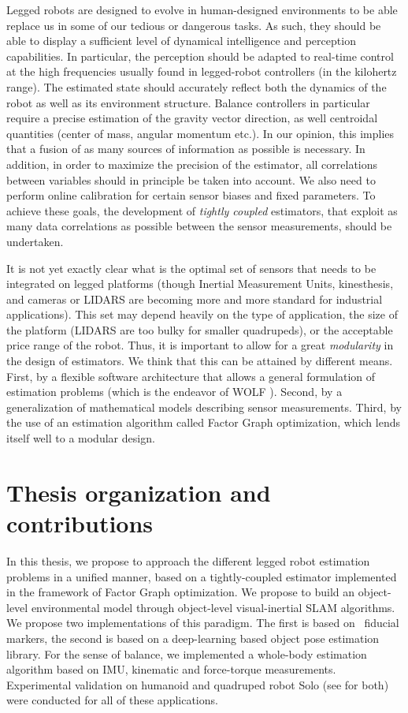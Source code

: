 Legged robots are designed to evolve in human-designed environments to be able replace us in some of our tedious or dangerous tasks. As such, they should be able to
display a sufficient level of dynamical intelligence and perception capabilities. 
In particular, the perception should be adapted to real-time control at the high frequencies usually found in legged-robot controllers (in the kilohertz range).
The estimated state should accurately reflect both the dynamics of the robot as well as its environment structure. Balance controllers in particular require a precise estimation of the gravity vector direction, as well centroidal quantities (center of mass, angular momentum etc.).
In our opinion, this implies that a fusion of as many sources of
information as possible is necessary. In addition, in order to maximize the precision of the estimator, all correlations between variables should in principle be taken into account. 
We also need to perform online calibration for certain sensor biases and fixed parameters. To achieve these goals, the development of \textit{tightly coupled} estimators, 
that exploit as many data correlations as possible between the sensor measurements, should be undertaken.

It is not yet exactly clear what is the optimal set of sensors that needs to be integrated on legged platforms (though Inertial Measurement Units, kinesthesis, and 
cameras or LIDARS are becoming more and more standard for industrial applications). This set may depend heavily on the type of application,
the size of the platform (LIDARS are too bulky for smaller quadrupeds), or the acceptable price range of the robot. Thus, it is important to allow
for a great \textit{modularity} in the design of estimators. We think that this can be attained by different means. First, by a flexible software architecture
that allows a general formulation of estimation problems (which is the endeavor of WOLF \cite{sola2021wolf}). Second, by a generalization of mathematical
models describing sensor measurements. Third, by the use of an estimation algorithm called Factor Graph optimization, which lends itself well to a modular design.




\section{Thesis organization and contributions}

In this thesis, we propose to approach the different legged robot estimation problems in a unified manner, based on a tightly-coupled estimator implemented in the framework of Factor Graph optimization.
We propose to build an object-level environmental model through object-level visual-inertial SLAM algorithms. We propose two implementations of this paradigm. 
The first is based on \apriltag\ fiducial markers, the second is based on a deep-learning based object pose estimation library.   
For the sense of balance, we implemented a whole-body estimation algorithm based on IMU, kinematic and force-torque measurements.
Experimental validation on humanoid  and quadruped robot Solo (see  for both) were conducted for all of these applications.

